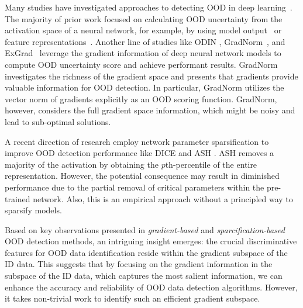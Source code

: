 \documentclass{article}
\begin{document}
Many studies have investigated approaches to detecting OOD in deep learning~\cite{chen2021robustifying, hendrycks17baseline, huang2021mos, lakshminarayanan2017simple, lee2018simple, liang2018enhancing, lin2021mood, liu2020energy,  mohseni2020self, nalisnick2018deep}. The majority of prior work focused on calculating OOD uncertainty from the activation space of a neural network, for example, by using model output~\cite{hendrycks17baseline,lakshminarayanan2017simple,liang2018enhancing, liu2020energy} or feature representations~\cite{lee2018simple}. Another line of studies like ODIN \cite{liang2018enhancing}, GradNorm~\cite{huang2021importance}, and ExGrad~\cite{igoe2022useful} leverage the gradient information of deep neural network models to compute OOD uncertainty score and achieve performant results. 
GradNorm~\cite{huang2021importance} investigates the richness of the gradient space and presents that gradients provide valuable information for OOD detection. In particular, GradNorm utilizes the vector norm of gradients explicitly as an OOD scoring function.
GradNorm, however, considers the full gradient space information, which might be noisy and lead to sub-optimal solutions.

A recent direction of research employ network parameter sparsification to improve OOD detection performance like DICE \cite{sun2022dice} and ASH \cite{ djurisic2022extremely}. ASH removes a majority of the activation by obtaining the ${p}$th-percentile of the entire representation. However, the potential consequence may result in diminished performance due to the partial removal of critical parameters within the pre-trained network. Also, this is an empirical approach without a principled way to sparsify models.  

Based on key observations presented in \textit{gradient-based} and \textit{sparcification-based} OOD detection methods, an intriguing insight emerges: the crucial discriminative features for OOD data identification reside within the gradient subspace of the ID data. This suggests that by focusing on the gradient information in the subspace of the ID data, which captures the most salient information, we can enhance the accuracy and reliability of OOD data detection algorithms. However, it takes non-trivial work to identify such an efficient gradient subspace. 
\end{document}
